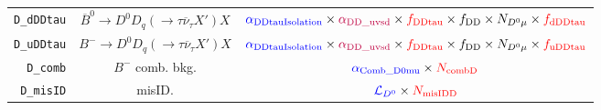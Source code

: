\begin{landscape}
\begin{table}
\begin{tabular}{r|c|c}
       \texttt{D\_dDDtau} &   $\overline{B}^0 \rightarrow D^0 D_q (\rightarrow \tau \overline{\nu}_\tau X') X$   &                                                                            $\textcolor{blue}{\alpha_\text{DDtauIsolation}} \times \textcolor{purple}{\alpha_\text{DD\_uvsd}} \times \textcolor{red}{f_\text{DDtau}} \times f_\text{DD} \times N_{D^0 \mu} \times \textcolor{red}{f_\text{dDDtau}}$                                                                            \\
       \texttt{D\_uDDtau} &        $B^- \rightarrow D^0 D_q (\rightarrow \tau \overline{\nu}_\tau X') X$         &                                                                            $\textcolor{blue}{\alpha_\text{DDtauIsolation}} \times \textcolor{purple}{\alpha_\text{DD\_uvsd}} \times \textcolor{red}{f_\text{DDtau}} \times f_\text{DD} \times N_{D^0 \mu} \times \textcolor{red}{f_\text{uDDtau}}$                                                                            \\
         \texttt{D\_comb} &                                   $B^-$ comb. bkg.                                   &                                                                                                                                              $\textcolor{blue}{\alpha_\text{Comb\_D0mu}} \times \textcolor{red}{N_\text{combD}}$                                                                                                                                              \\
        \texttt{D\_misID} &                                        misID.                                        &                                                                                                                                                 $\textcolor{blue}{\mathcal{L}_{D^0}} \times \textcolor{red}{N_\text{misIDD}}$                                                                                                                                                 \\
\bottomrule
\end{tabular}

\end{table}
\end{landscape}
\restoregeometry


